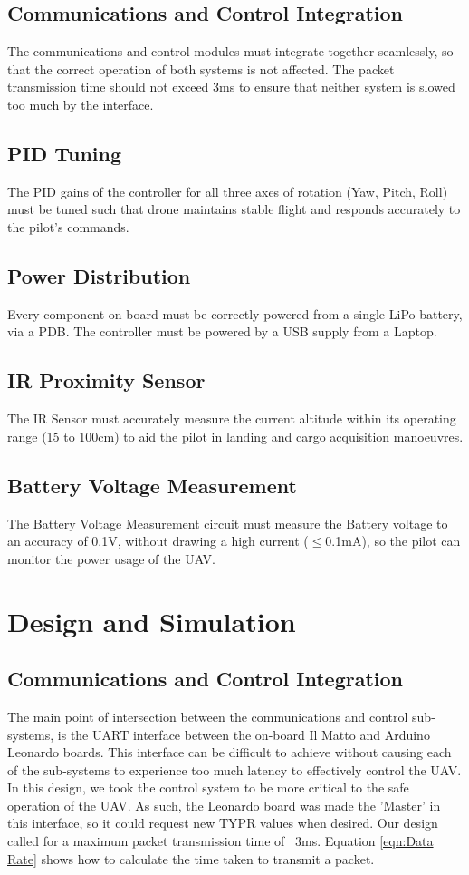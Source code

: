 \documentclass[a4paper,11pt]{article}
\begin{document}
\subsection{Communications and Control Integration}
The communications and control modules must integrate together seamlessly, so that the correct operation of both systems is not affected. The packet transmission time should not exceed 3ms to ensure that neither system is slowed too much by the interface.
\subsection{PID Tuning}
The PID gains of the controller for all three axes of rotation (Yaw, Pitch, Roll) must be tuned such that drone maintains stable flight and responds accurately to the pilot's commands.
\subsection{Power Distribution}
Every component on-board must be correctly powered from a single LiPo battery, via a PDB. The controller must be powered by a USB supply from a Laptop.
\subsection{IR Proximity Sensor}
The IR Sensor must accurately measure the current altitude within its operating range (15 to 100cm) to aid the pilot in landing and cargo acquisition manoeuvres.
\subsection{Battery Voltage Measurement}
The Battery Voltage Measurement circuit must measure the Battery voltage to an accuracy of 0.1V, without drawing a high current ($\leq$0.1mA), so the pilot can monitor the power usage of the UAV.

\section{Design and Simulation}
\subsection{Communications and Control Integration}
The main point of intersection between the communications and control sub-systems, is the UART interface between the on-board Il Matto and Arduino Leonardo boards. This interface can be difficult to achieve without causing each of the sub-systems to experience too much latency to effectively control the UAV. In this design, we took the control system to be more critical to the safe operation of the UAV. As such, the Leonardo board was made the 'Master' in this interface, so it could request new TYPR values when desired. Our design called for a maximum packet transmission time of ~3ms. Equation \ref{eqn:Data Rate} shows how to calculate the time taken to transmit a packet. 
\end{document}
